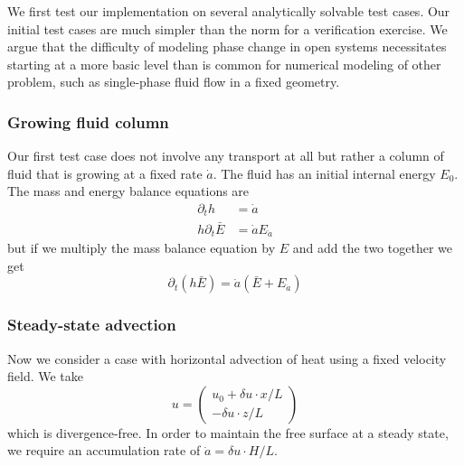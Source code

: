 \documentclass{article}
\theoremstyle{definition}
\theoremstyle{plain}
\begin{document}
We first test our implementation on several analytically solvable test cases.
Our initial test cases are much simpler than the norm for a verification exercise.
We argue that the difficulty of modeling phase change in open systems necessitates starting at a more basic level than is common for numerical modeling of other problem, such as single-phase fluid flow in a fixed geometry.

\subsubsection{Growing fluid column}
Our first test case does not involve any transport at all but rather a column of fluid that is growing at a fixed rate $\dot a$.
The fluid has an initial internal energy $E_0$.
The mass and energy balance equations are
\begin{align}
    \partial_t h & = \dot a \\
    h\partial_t \bar E & = \dot a E_{\dot a}
\end{align}
but if we multiply the mass balance equation by $E$ and add the two together we get
\begin{equation}
    \partial_t(h\bar E) = \dot a(\bar E + E_{\dot a})
\end{equation}

\subsubsection{Steady-state advection}
Now we consider a case with horizontal advection of heat using a fixed velocity field.
We take
\begin{equation}
    u = \left(\begin{matrix}u_0 + \delta u\cdot x / L \\ -\delta u \cdot z / L\end{matrix}\right)
\end{equation}
which is divergence-free.
In order to maintain the free surface at a steady state, we require an accumulation rate of $\dot a = \delta u \cdot H / L$.
\end{document}
